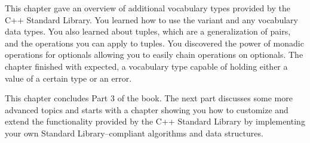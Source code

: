 This chapter gave an overview of additional vocabulary types provided by the C++ Standard Library. You learned how to use the variant and any vocabulary data types. You also learned about tuples, which are a generalization of pairs, and the operations you can apply to tuples. You discovered the power of monadic operations for optionals allowing you to easily chain operations on optionals. The chapter finished with expected, a vocabulary type capable of holding either a value of a certain type or an error.

This chapter concludes Part 3 of the book. The next part discusses some more advanced topics and starts with a chapter showing you how to customize and extend the functionality provided by the C++ Standard Library by implementing your own Standard Library–compliant algorithms and data structures.
